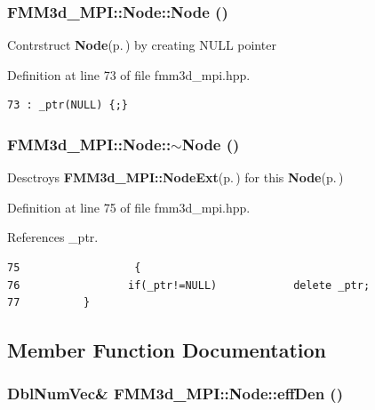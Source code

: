 \subsubsection{\setlength{\rightskip}{0pt plus 5cm}FMM3d\_\-MPI::Node::Node ()\hspace{0.3cm}{\tt  [inline]}}\label{classFMM3d__MPI_1_1Node_cbf468557fa59dd3c0d6c693d060cdcd_cbf468557fa59dd3c0d6c693d060cdcd}


Contrstruct {\bf Node}{\rm (p.\,\pageref{classFMM3d__MPI_1_1Node})} by creating NULL pointer 

Definition at line 73 of file fmm3d\_\-mpi.hpp.

\footnotesize\begin{verbatim}73 : _ptr(NULL) {;}
\end{verbatim}\normalsize 


\subsubsection{\setlength{\rightskip}{0pt plus 5cm}FMM3d\_\-MPI::Node::$\sim$Node ()\hspace{0.3cm}{\tt  [inline]}}\label{classFMM3d__MPI_1_1Node_cb9f183fa6855dd10f3e01bce1a87a15_cb9f183fa6855dd10f3e01bce1a87a15}


Desctroys {\bf FMM3d\_\-MPI::Node\-Ext}{\rm (p.\,\pageref{classFMM3d__MPI_1_1NodeExt})} for this {\bf Node}{\rm (p.\,\pageref{classFMM3d__MPI_1_1Node})} 

Definition at line 75 of file fmm3d\_\-mpi.hpp.

References \_\-ptr.

\footnotesize\begin{verbatim}75                  {
76                 if(_ptr!=NULL)            delete _ptr;
77          }
\end{verbatim}\normalsize 




\subsection{Member Function Documentation}
\subsubsection{\setlength{\rightskip}{0pt plus 5cm}Dbl\-Num\-Vec\& FMM3d\_\-MPI::Node::eff\-Den ()\hspace{0.3cm}{\tt  [inline]}}\label{classFMM3d__MPI_1_1Node_d1db194d844074ad9ca4d3235b5303e5_d1db194d844074ad9ca4d3235b5303e5}


